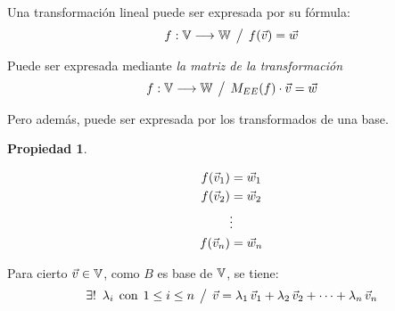 \documentclass[a5paper,12pt,twoside]{book}
\newtheorem{prop}{{Propiedad}}[chapter]
\begin{document}
Una transformación lineal puede ser expresada por su fórmula:
\begin{equation*}
    f: \mathbb{V} \longrightarrow \mathbb{W} \hspace{1ex} \big/ \hspace{1ex} f(\Vec{v}) = \Vec{w}
\end{equation*}

Puede ser expresada mediante \emph{la matriz de la transformación} 
\begin{equation*}
    f: \mathbb{V} \longrightarrow \mathbb{W} \hspace{1ex} \big/ \hspace{1ex} M_{EE}(f) \cdot \Vec{v} = \Vec{w}
\end{equation*}

Pero además, puede ser expresada por los transformados de una base.

\begin{mdframed}[style=MyFrame1]
    \begin{prop}
    \end{prop}
    \begin{gather*}
        f(\Vec{v}_1) = \Vec{w}_1
        \\
        f(\Vec{v}_2) = \Vec{w}_2
        \\
        \vdots
        \\
        f(\Vec{v}_n) = \Vec{w}_n
    \end{gather*}
\end{mdframed}


Para cierto $\Vec{v} \in \mathbb{V}$, como $B$ es base de $\mathbb{V}$, se tiene:
\begin{equation*}
    \exists ! \enspace \lambda_i \hspace{1ex} \textrm{con} \hspace{1ex} 1 \leq i \leq n \hspace{1ex} \big/ \hspace{1ex}
    \Vec{v} = \lambda_1 \, \Vec{v}_1 + \lambda_2 \, \Vec{v}_2 + \dots + \lambda_n \, \Vec{v}_n
\end{equation*}
\end{document}

